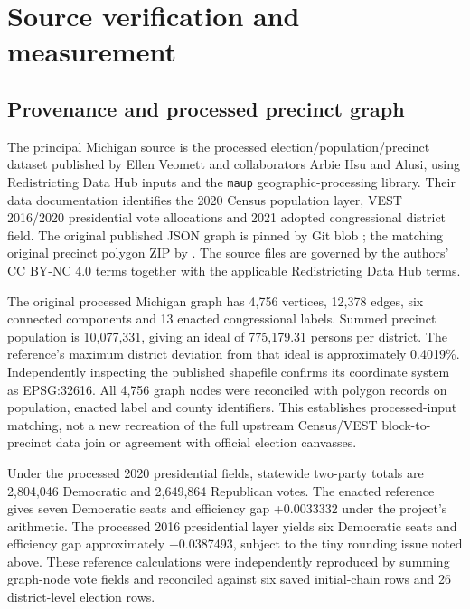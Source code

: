 \documentclass[
  10pt,
]{article}
\begin{document}
\hypertarget{source-verification-and-measurement}{%
\section{Source verification and
measurement}\label{source-verification-and-measurement}}

\hypertarget{provenance-and-processed-precinct-graph}{%
\subsection{Provenance and processed precinct
graph}\label{provenance-and-processed-precinct-graph}}

The principal Michigan source is the processed
election/population/precinct dataset published by Ellen Veomett and
collaborators Arbie Hsu and Alusi, using Redistricting Data Hub inputs
and the \texttt{maup} geographic-processing library. Their data
documentation identifies the 2020 Census population layer, VEST
2016/2020 presidential vote allocations and 2021 adopted congressional
district field. The original published JSON graph is pinned by Git blob
\texttt{}; the
matching original precinct polygon ZIP by
\texttt{}. The source
files are governed by the authors' CC BY-NC 4.0 terms together with the
applicable Redistricting Data Hub terms.

The original processed Michigan graph has 4,756 vertices, 12,378 edges,
six connected components and 13 enacted congressional labels. Summed
precinct population is 10,077,331, giving an ideal of 775,179.31 persons
per district. The reference's maximum district deviation from that ideal
is approximately 0.4019\%. Independently inspecting the published
shapefile confirms its coordinate system as EPSG:32616. All 4,756 graph
nodes were reconciled with polygon records on population, enacted label
and county identifiers. This establishes processed-input matching, not a
new recreation of the full upstream Census/VEST block-to-precinct data
join or agreement with official election canvasses.

Under the processed 2020 presidential fields, statewide two-party totals
are 2,804,046 Democratic and 2,649,864 Republican votes. The enacted
reference gives seven Democratic seats and efficiency gap +0.0033332
under the project's arithmetic. The processed 2016 presidential layer
yields six Democratic seats and efficiency gap approximately −0.0387493,
subject to the tiny rounding issue noted above. These reference
calculations were independently reproduced by summing graph-node vote
fields and reconciled against six saved initial-chain rows and 26
district-level election rows.
\end{document}
